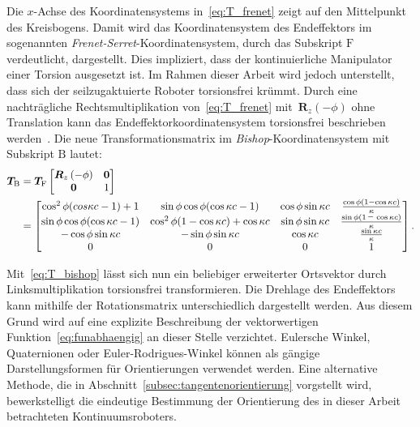 Die \mbox{$x$-Achse} des Koordinatensystems in~\eqref{eq:T_frenet} zeigt auf den Mittelpunkt des Kreisbogens. Damit wird das Koordinatensystem des Endeffektors im sogenannten \textit{Frenet-Serret}-Koordinatensystem, durch das Subskript $\mathrm{F}$ verdeutlicht, dargestellt. Dies impliziert, dass der kontinuierliche Manipulator einer Torsion ausgesetzt ist. Im Rahmen dieser Arbeit wird jedoch unterstellt, dass sich der seilzugaktuierte Roboter torsionsfrei krümmt. Durch eine nachträgliche Rechtsmultiplikation von~\eqref{eq:T_frenet} \mbox{mit $\bm{R}_z(-\phi)$} ohne Translation kann das Endeffektorkoordinatensystem torsionsfrei beschrieben werden~\cite{WIJ10}. Die neue Transformationsmatrix im \textit{Bishop}-Koordinatensystem mit Subskript $\mathrm{B}$ lautet:
\begin{align}
\bm{T}_\mathrm{B} &=  \bm{T}_{\mathrm{F}}
\begin{bmatrix}
\bm{R}_z\left( -\phi \right) & \bm{0}\\
\bm{0} & 1 
\end{bmatrix} \nonumber \\
&=\begin{bmatrix}
\cos^2\phi(cos\kappa c - 1)+1 & \sin\phi\cos\phi (\cos\kappa c -1) & \cos\phi \sin\kappa c & \frac{\cos\phi(1-\cos\kappa c)}{\kappa} \\
\sin\phi \cos\phi (\cos\kappa c-1) & \cos^2\phi(1-\cos\kappa c)+\cos\kappa c & \sin\phi \sin\kappa c & \frac{\sin\phi(1 \shortminus \cos\kappa c)}{\kappa} \\
-\cos\phi \sin\kappa c & -\sin\phi \sin\kappa c & \cos\kappa c & \frac{\sin\kappa c}{\kappa} \\
0 & 0 & 0 & 1 
\end{bmatrix}.
\label{eq:T_bishop}
\end{align}

Mit~\eqref{eq:T_bishop} lässt sich nun ein beliebiger erweiterter Ortsvektor durch Linksmultiplikation torsionsfrei transformieren. 
Die Drehlage des Endeffektors kann mithilfe der Rotationsmatrix unterschiedlich dargestellt werden. Aus diesem Grund wird auf eine explizite Beschreibung der vektorwertigen Funktion~\eqref{eq:funabhaengig} an dieser Stelle verzichtet. Eulersche Winkel, Quaternionen oder Euler-Rodrigues-Winkel können als gängige Darstellungsformen für Orientierungen verwendet werden. Eine alternative Methode, die in Abschnitt~\ref{subsec:tangentenorientierung} vorgstellt wird, bewerkstelligt die eindeutige Bestimmung der Orientierung des in dieser Arbeit betrachteten Kontinuumsroboters.

